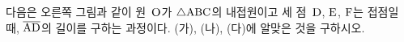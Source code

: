 \noindent\begin{minipage}[t]{0.58\linewidth}\vspace{0pt}\raggedright 다음은 오른쪽 그림과 같이 원~$\mathrm{O}$가 $\triangle\mathrm{ABC}$의 내접원이고 세 점~$\mathrm{D}$, $\mathrm{E}$, $\mathrm{F}$는 접점일 때, $\overline{\mathrm{AD}}$의 길이를 구하는 과정이다. (가), (나), (다)에 알맞은 것을 구하시오. \end{minipage}\hfill\begin{minipage}[t]{0.4\linewidth}\vspace{0pt}\centering \resizebox{\ifdim\width>\linewidth\linewidth\else\width\fi}{!}{}\end{minipage}\par
\noindent {}
